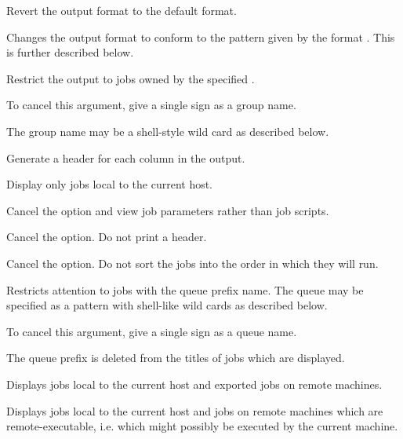 
Revert the output format to the default format.


Changes the output format to conform to the pattern given by the format . This is further described below.


Restrict the output to jobs owned by the specified .

To cancel this argument, give a single \exampletext{{}-} sign as a group name.

The group name may be a shell-style wild card as described below.


Generate a header for each column in the output.


Display only jobs local to the current host.


Cancel the  option and view job parameters rather than job scripts.


Cancel the  option. Do not print a header.


Cancel the  option. Do not sort the jobs into the order in which they will run.


Restricts attention to jobs with the queue prefix name. The queue may be specified as a pattern with shell-like wild cards as
described below.

To cancel this argument, give a single \exampletext{{}-} sign as a queue name.

The queue prefix is deleted from the titles of jobs which are displayed.


Displays jobs local to the current host and exported jobs on remote machines.


Displays jobs local to the current host and jobs on remote machines which are remote-executable, i.e. which might possibly be
executed by the current machine.

